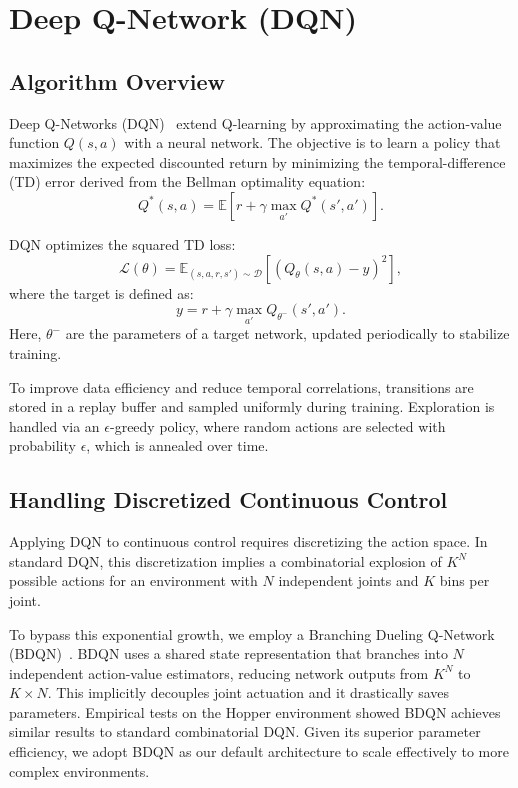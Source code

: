 \section{Deep Q-Network (DQN)}
\label{sec:dqn}

\subsection{Algorithm Overview}

Deep Q-Networks (DQN)~\cite{mnih2015humanlevel} extend Q-learning by approximating the action-value function \(Q(s,a)\) with a neural network. The objective is to learn a policy that maximizes the expected discounted return by minimizing the temporal-difference (TD) error derived from the Bellman optimality equation:
\begin{equation}
    Q^*(s,a) = \mathbb{E}\left[r + \gamma \max_{a'} Q^*(s', a')\right].
\end{equation}

DQN optimizes the squared TD loss:
\begin{equation}
    \mathcal{L}(\theta) = \mathbb{E}_{(s,a,r,s') \sim \mathcal{D}} \left[ {\left( Q_\theta(s,a) - y \right)}^2 \right],
\end{equation}
where the target is defined as:
\begin{equation}
    y = r + \gamma \max_{a'} Q_{\theta^-}(s', a').
\end{equation}
Here, \(\theta^-\) are the parameters of a target network, updated periodically to stabilize training.

To improve data efficiency and reduce temporal correlations, transitions are stored in a replay buffer and sampled uniformly during training. Exploration is handled via an \(\epsilon\)-greedy policy, where random actions are selected with probability \(\epsilon\), which is annealed over time.

\subsection{Handling Discretized Continuous Control}

Applying DQN to continuous control requires discretizing the action space. In standard DQN, this discretization implies a combinatorial explosion of $K^N$ possible actions for an environment with $N$ independent joints and $K$ bins per joint. 

To bypass this exponential growth, we employ a Branching Dueling Q-Network (BDQN)~\cite{tavakoli2019action}. BDQN uses a shared state representation that branches into $N$ independent action-value estimators, reducing network outputs from $K^N$ to $K \times N$. This implicitly decouples joint actuation and it drastically saves parameters. Empirical tests on the Hopper environment showed BDQN achieves similar results to standard combinatorial DQN. Given its superior parameter efficiency, we adopt BDQN as our default architecture to scale effectively to more complex environments.

